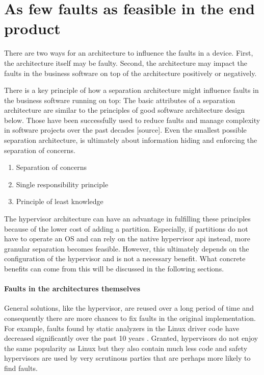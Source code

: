 
\section{As few faults as feasible in the end product}
There are two ways for an architecture to influence the faults in a device. First, the architecture itself may be faulty. Second, the architecture may impact the faults in the business software on top of the architecture positively or negatively.

There is a key principle of how a separation architecture might influence faults in the business software running on top: The basic attributes of a separation architecture are similar to the principles of good software architecture design below. Those have been successfully used to reduce faults and manage complexity in software projects over the past decades [source]. Even the smallest possible separation architecture, is ultimately about information hiding and enforcing the separation of concerns.
\begin{enumerate}
\item Separation of concerns
\item Single responsibility principle
\item Principle of least knowledge
\end{enumerate}
The hypervisor architecture can have an advantage in fulfilling these principles because of the lower cost of adding a partition. Especially, if partitions do not have to operate an OS and can rely on the native hypervisor \acrshort{api} instead, more granular separation becomes feasible. However, this ultimately depends on the configuration of the hypervisor and is not a necessary benefit.
What concrete benefits can come from this will be discussed in the following sections.
\paragraph{Faults in the architectures themselves}
General solutions, like the hypervisor, are reused over a long period of time and consequently there are more chances to fix faults in the original implementation. For example, faults found by static analyzers in the Linux driver code have decreased significantly over the past 10 years \cite{palix2011faults}. Granted, hypervisors do not enjoy the same popularity as Linux but they also contain much less code and safety hypervisors are used by very scrutinous  parties that are perhaps more likely to find faults.

